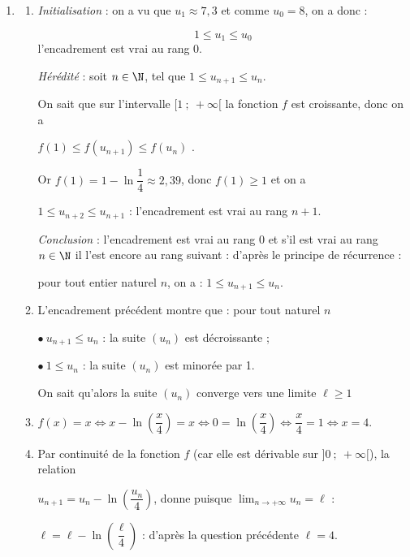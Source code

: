 \begin{enumerate}[resume]
\item 
	\begin{enumerate}
		\item %

\emph{Initialisation} : on a vu que $u_1 \approx 7,3$ et comme $u_0 = 8$, on a donc :

\[1 \leqslant u_{1} \leqslant u_0\]
l'encadrement est vrai au rang 0.

\emph{Hérédité} : soit $n \in \N$, tel que  $1 \leqslant u_{n+1} \leqslant u_n$.

On sait que sur l'intervalle $[1~;~+ \infty[$ la fonction $f$ est croissante, donc on a 

$f(1) \leqslant f\left(u_{n+1}\right) \leqslant f\left(u_{n}\right)$ .

Or $f(1) = 1 - \ln \dfrac14 \approx 2,39$, donc $f(1) \geqslant 1$ et on a 

$1 \leqslant u_{n+2} \leqslant u_{n+1}$ : l'encadrement est vrai au rang $n + 1$.

\emph{Conclusion} : l'encadrement est vrai au rang 0 et s'il est vrai au rang $n \in \N$ il l'est encore au rang suivant : d'après le principe de récurrence :

pour tout entier naturel $n$, on a : $1 \leqslant u_{n+1} \leqslant u_n.$

	\item L'encadrement précédent montre que : pour tout naturel $n$

$\bullet~ u_{n+1} \leqslant u_n$ : la suite $\left(u_n\right)$ est décroissante ;

$\bullet~ 1 \leqslant u_n$ :  la suite $\left(u_n\right)$ est minorée par 1.

On sait qu'alors la suite $\left(u_n\right)$ converge vers une limite $\ell \geqslant 1$

		\item %
$f(x) = x \iff x - \ln \left(\dfrac x4 \right) = x \iff 0 = \ln \left(\dfrac x4 \right) \iff \dfrac x4  = 1 \iff x = 4$.
		\item %
Par continuité de la fonction $f$ (car elle est dérivable sur $]0~;~+ \infty[$), la relation 

$u_{n+1} = u_n - \ln \left(\dfrac{u_n}{4}\right)$, donne puisque $\displaystyle\lim_{ n \to + \infty} u_n = \ell$ :

$\ell = \ell - \ln \left(\dfrac{\ell}{4}\right)$ : d'après la question précédente $\ell = 4$.

	\end{enumerate}
\end{enumerate}

\bigskip

